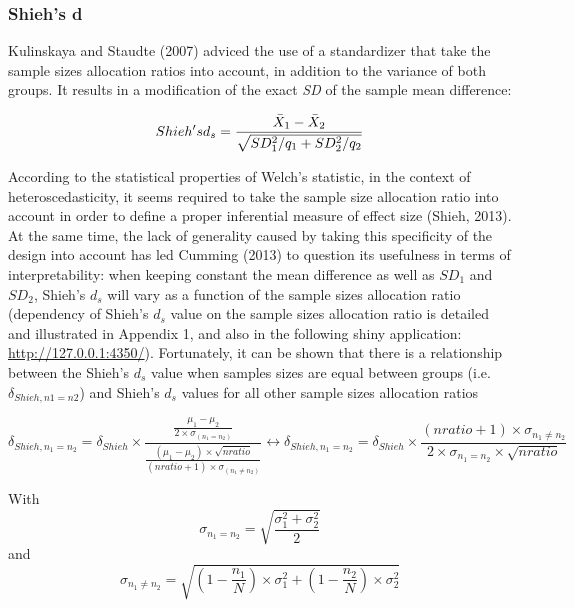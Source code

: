 \documentclass[man]{apa6}
\begin{document}
\hypertarget{shiehs-d}{%
\subsubsection{Shieh's d}\label{shiehs-d}}

Kulinskaya and Staudte (2007) adviced the use of a standardizer that take the sample sizes allocation ratios into account, in addition to the variance of both groups. It results in a modification of the exact \emph{SD} of the sample mean difference:

\begin{equation} 
Shieh's \space d_s = \frac{\bar{X}_1 - \bar{X}_2}{\sqrt{SD_1^2/q_1+SD_2^2/q_2}}
\label{eq:Shiehds}
\end{equation}

According to the statistical properties of Welch's statistic, in the context of heteroscedasticity, it seems required to take the sample size allocation ratio into account in order to define a proper inferential measure of effect size (Shieh, 2013). At the same time, the lack of generality caused by taking this specificity of the design into account has led Cumming (2013) to question its usefulness in terms of interpretability: when keeping constant the mean difference as well as \(SD_1\) and \(SD_2\), Shieh's \(d_s\) will vary as a function of the sample sizes allocation ratio (dependency of Shieh's \(d_s\) value on the sample sizes allocation ratio is detailed and illustrated in Appendix 1, and also in the following shiny application: \url{http://127.0.0.1:4350/}). Fortunately, it can be shown that there is a relationship between the Shieh's \(d_s\) value when samples sizes are equal between groups (i.e.~\(\delta_{Shieh, n1=n2}\)) and Shieh's \(d_s\) values for all other sample sizes allocation ratios

\begin{equation} 
\delta_{Shieh,n_1=n_2}= \delta_{Shieh} \times \frac{\frac{\mu_1-\mu_2}{2 \times \sigma_{(n_1=n_2)}}}{\frac{(\mu_1-\mu_2) \times \sqrt{nratio}}{(nratio+1) \times \sigma_{(n_1\neq n_2)}}}
\leftrightarrow \delta_{Shieh,n_1=n_2}= \delta_{Shieh} \times \frac{(nratio+1) \times \sigma_{n_1 \neq n_2}}{2 \times \sigma_{n_1=n_2} \times \sqrt{nratio}}
\label{eq:shiehvsbaldesign}
\end{equation}

With \[\sigma_{n_1=n_2}= \sqrt{\frac{\sigma_1^2+\sigma_2^2}{2}}\] and
\[\sigma_{n_1 \neq n_2} = \sqrt{(1- \frac{n_1}{N}) \times \sigma_1^2+(1- \frac{n_2}{N}) \times \sigma_2^2}\]
\end{document}
